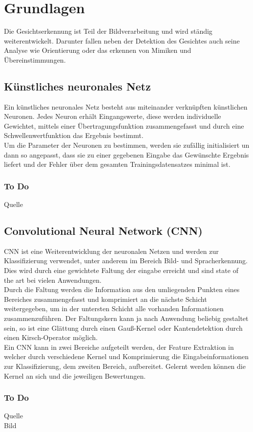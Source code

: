 \section{Grundlagen}
Die Gesichtserkennung ist Teil der Bildverarbeitung und wird ständig weiterentwickelt. Darunter fallen neben der Detektion des Gesichtes auch seine Analyse wie Orientierung oder das erkennen von Mimiken und Übereinstimmungen. 
\subsection{Künstliches neuronales Netz}
Ein künstliches neuronales Netz besteht aus miteinander verknüpften künstlichen Neuronen. Jedes Neuron erhält Eingangswerte, diese werden individuelle Gewichtet, mittels einer Übertragungsfunktion zusammengefasst und durch eine Schwellenwertfunktion das Ergebnis bestimmt.\\
Um die Parameter der Neuronen zu bestimmen, werden sie zufällig initialisiert un dann so angepasst, dass sie zu einer gegebenen Eingabe das Gewünschte Ergebnis liefert und der Fehler über dem gesamten Trainingsdatensatzes minimal ist.
\subsubsection{To Do}
Quelle
\subsection{Convolutional Neural Network (CNN)}
CNN ist eine Weiterentwicklung der neuronalen Netzen und werden zur Klassifizierung verwendet, unter anderem im Bereich Bild- und Spracherkennung. Dies wird durch eine gewichtete Faltung der eingabe erreicht und sind  state of the art bei vielen Anwendungen.\\
Durch die Faltung werden die Information aus den umliegenden Punkten eines Bereiches zusammengefasst und komprimiert an die nächste Schicht weitergegeben, um in der untersten Schicht alle vorhanden Informationen zusammenzuführen. 
Der Faltungskern kann ja nach Anwendung beliebig gestaltet sein, so ist eine Glättung durch einen Gauß-Kernel oder Kantendetektion durch einen Kirsch-Operator möglich.\\
Ein CNN kann in zwei Bereiche aufgeteilt werden, der Feature Extraktion in welcher durch verschiedene Kernel und Komprimierung die Eingabeinformationen zur Klassifizierung, dem zweiten Bereich, aufbereitet.
Gelernt werden können die Kernel an sich und die jeweiligen Bewertungen.
\subsubsection{To Do}
Quelle\\
Bild
